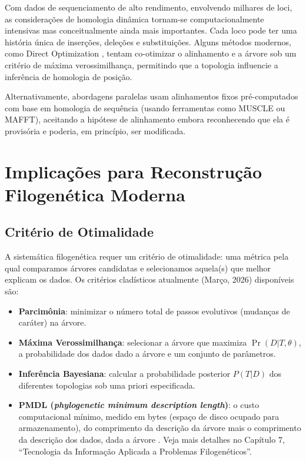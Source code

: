 Com dados de sequenciamento de alto rendimento, envolvendo milhares de loci, as considerações de homologia dinâmica tornam-se computacionalmente intensivas mas conceitualmente ainda mais importantes. Cada loco pode ter uma história única de inserções, deleções e substituições. Alguns métodos modernos, como Direct Optimization \parencite{wheeler2006}, tentam co-otimizar o alinhamento e a árvore sob um critério de máxima verossimilhança, permitindo que a topologia influencie a inferência de homologia de posição.

Alternativamente, abordagens paralelas usam alinhamentos fixos pré-computados com base em homologia de sequência (usando ferramentas como MUSCLE ou MAFFT), aceitando a hipótese de alinhamento embora reconhecendo que ela é provisória e poderia, em princípio, ser modificada.

\section{Implicações para Reconstrução Filogenética Moderna}

\subsection{Critério de Otimalidade}

A sistemática filogenética requer um critério de otimalidade: uma métrica pela qual comparamos árvores candidatas e selecionamos aquela(s) que melhor explicam os dados. Os critérios cladísticos atualmente (Março, 2026) disponíveis são:

\begin{itemize}
    \item \textbf{Parcimônia}: minimizar o número total de passos evolutivos (mudanças de caráter) na árvore.
    \item \textbf{Máxima Verossimilhança}: selecionar a árvore que maximiza $\Pr(D|T, \theta)$, a probabilidade dos dados dado a árvore e um conjunto de parâmetros.
    \item \textbf{Inferência Bayesiana}: calcular a probabilidade posterior $P(T|D)$ dos diferentes topologias sob uma priori especificada.
    \item \textbf{PMDL (\textit{phylogenetic minimum description length})}: o custo computacional mínimo, medido em bytes (espaço de disco ocupado para armazenamento), do comprimento da descrição da árvore mais o comprimento da descrição dos dados, dada a árvore \parencite{wheeler2025}. Veja mais detalhes no Capítulo 7, ``Tecnologia da Informação Aplicada a Problemas Filogenéticos''.
\end{itemize}

